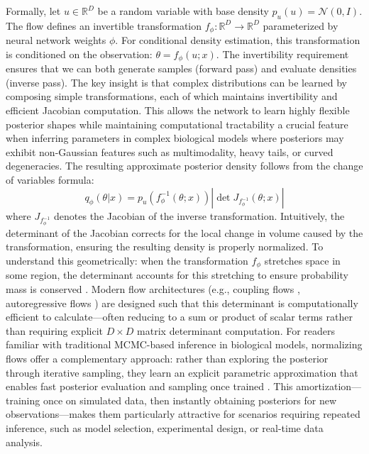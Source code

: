 \documentclass{article}
\begin{document}
Formally, let $u \in \mathbb{R}^D$ be a random variable with base density $p_u(u) = \mathcal{N}(0, I)$. The flow defines an invertible transformation $f_\phi: \mathbb{R}^D \rightarrow \mathbb{R}^D$ parameterized by neural network weights $\phi$. For conditional density estimation, this transformation is conditioned on the observation: $\theta = f_\phi(u; x)$. The invertibility requirement ensures that we can both generate samples (forward pass) and evaluate densities (inverse pass). The key insight is that complex distributions can be learned by composing simple transformations, each of which maintains invertibility and efficient Jacobian computation. This allows the network to learn highly flexible posterior shapes while maintaining computational tractability a crucial feature when inferring parameters in complex biological models where posteriors may exhibit non-Gaussian features such as multimodality, heavy tails, or curved degeneracies. The resulting approximate posterior density follows from the change of variables formula:
\begin{equation}
	q_\phi(\theta | x) = p_u(f_\phi^{-1}(\theta; x)) \left| \det J_{f_\phi^{-1}}(\theta; x) \right|
\end{equation}
where $J_{f_\phi^{-1}}$ denotes the Jacobian of the inverse transformation. Intuitively, the determinant of the Jacobian corrects for the local change in volume caused by the transformation, ensuring the resulting density is properly normalized. To understand this geometrically: when the transformation $f_{\phi}$
stretches space in some region, the determinant accounts for this stretching to ensure probability mass is conserved \cite{papamakarios2021normalizing}. Modern flow architectures (e.g., coupling flows \cite{dinh2016density}, autoregressive flows \cite{papamakarios2017masked}) are designed such that this determinant is computationally efficient to calculate—often reducing to a sum or product of scalar terms rather than requiring explicit $D \times D$ matrix determinant computation. For readers familiar with traditional MCMC-based inference in biological models, normalizing flows offer a complementary approach: rather than exploring the posterior through iterative sampling, they learn an explicit parametric approximation that enables fast posterior evaluation and sampling once trained \cite{Cranmer2020FrontierSBI}. This amortization—training once on simulated data, then instantly obtaining posteriors for new observations—makes them particularly attractive for scenarios requiring repeated inference, such as model selection, experimental design, or real-time data analysis.
\end{document}
